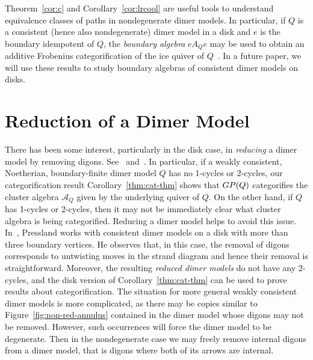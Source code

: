 \documentclass{article}
\theoremstyle{definition}
\renewcommand{\AA}{\mathscr A}
\begin{document}
Theorem~\ref{cor:c} and Corollary~\ref{cor:lrcool} are useful tools to understand equivalence classes of paths in nondegenerate dimer models.
{In particular, if $Q$ is a consistent (hence also nondegenerate) dimer model in a disk and $e$ is the boundary idempotent of $Q$, the \textit{boundary algebra} $eA_Qe$ may be used to obtain an additive Frobenius categorification of the ice quiver of $Q$~\cite{XPressland2019}. In a future paper, we will use these results to study boundary algebras of consistent dimer models on disks.}





	









\section{Reduction of a Dimer Model}\label{sec:red}
\label{sec:reduce}

There has been some interest, particularly in the disk case, in \textit{reducing} a dimer model by removing digons. See~\cite{XPressland2019} and~\cite[Remark 2.9]{XBroomhead2009}.
In particular, if a weakly consistent, Noetherian, boundary-finite dimer model $Q$ has no 1-cycles or 2-cycles, our categorification result Corollary~\ref{thm:cat-thm} shows that $\textup{GP}(Q)$ categorifies the cluster algebra $\AA_Q$ given by the underlying quiver of $Q$. On the other hand, if $Q$ has 1-cycles or 2-cycles, then it may not be immediately clear what cluster algebra is being categorified. Reducing a dimer model helps to avoid this issue.
In~\cite{XPressland2019}, Pressland works with consistent dimer models on a disk with more than three boundary vertices. He observes that, in this case, the removal of digons corresponds to untwisting moves in the strand diagram and hence their removal is straightforward. Moreover, the resulting \textit{reduced dimer models} do not have any 2-cycles, and the disk version of Corollary~\ref{thm:cat-thm} can be used to prove results about categorification. The situation for more general weakly consistent dimer models is more complicated, as there may be copies similar to Figure~\ref{fig:non-red-annulus} contained in the dimer model whose digons may not be removed. However, such occurrences will force the dimer model to be degenerate. Then in the nondegenerate case we may freely remove internal digons from a dimer model, that is digons where both of its arrows are internal. 
\end{document}

